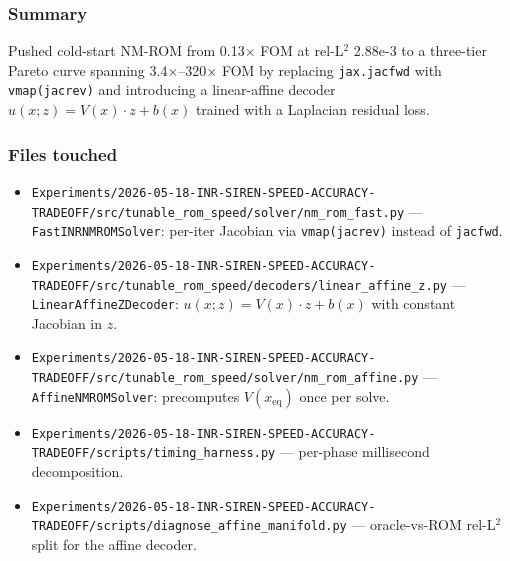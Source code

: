 
\subsubsection*{Summary}
Pushed cold-start NM-ROM from 0.13$\times$ FOM at rel-L$^2$ 2.88e-3 to a
three-tier Pareto curve spanning 3.4$\times$--320$\times$ FOM by replacing
\texttt{jax.jacfwd} with \texttt{vmap(jacrev)} and introducing a
linear-affine decoder $u(x;z) = V(x){\cdot}z + b(x)$ trained with a
Laplacian residual loss.

\subsubsection*{Files touched}
\begin{itemize}
  \item \texttt{Experiments/2026-05-18-INR-SIREN-SPEED-ACCURACY-TRADEOFF/src/tunable\_rom\_speed/solver/nm\_rom\_fast.py}
        --- \texttt{FastINRNMROMSolver}: per-iter Jacobian via
        \texttt{vmap(jacrev)} instead of \texttt{jacfwd}.
  \item \texttt{Experiments/2026-05-18-INR-SIREN-SPEED-ACCURACY-TRADEOFF/src/tunable\_rom\_speed/decoders/linear\_affine\_z.py}
        --- \texttt{LinearAffineZDecoder}: $u(x;z) = V(x){\cdot}z + b(x)$
        with constant Jacobian in $z$.
  \item \texttt{Experiments/2026-05-18-INR-SIREN-SPEED-ACCURACY-TRADEOFF/src/tunable\_rom\_speed/solver/nm\_rom\_affine.py}
        --- \texttt{AffineNMROMSolver}: precomputes $V(x_{\text{eq}})$
        once per solve.
  \item \texttt{Experiments/2026-05-18-INR-SIREN-SPEED-ACCURACY-TRADEOFF/scripts/timing\_harness.py}
        --- per-phase millisecond decomposition.
  \item \texttt{Experiments/2026-05-18-INR-SIREN-SPEED-ACCURACY-TRADEOFF/scripts/diagnose\_affine\_manifold.py}
        --- oracle-vs-ROM rel-L$^2$ split for the affine decoder.
\end{itemize}

